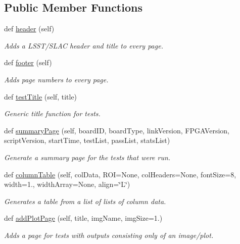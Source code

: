 \subsection*{Public Member Functions}
\begin{DoxyCompactItemize}
\item 
def \hyperlink{classpdf_gen_w_r_e_b_1_1_p_d_f_ae0da62a475a1b97d62428ae3c662f2a6}{header} (self)
\begin{DoxyCompactList}\small\item\em Adds a L\+S\+S\+T/\+S\+L\+AC header and title to every page. \end{DoxyCompactList}\item 
def \hyperlink{classpdf_gen_w_r_e_b_1_1_p_d_f_a01a4153716448dc03856712735fee900}{footer} (self)
\begin{DoxyCompactList}\small\item\em Adds page numbers to every page. \end{DoxyCompactList}\item 
def \hyperlink{classpdf_gen_w_r_e_b_1_1_p_d_f_a682682f02997f0cc3fefc7468265a90b}{test\+Title} (self, title)
\begin{DoxyCompactList}\small\item\em Generic title function for tests. \end{DoxyCompactList}\item 
def \hyperlink{classpdf_gen_w_r_e_b_1_1_p_d_f_a08028486631686cbf99a23e97485478b}{summary\+Page} (self, board\+ID, board\+Type, link\+Version, F\+P\+G\+A\+Version, script\+Version, start\+Time, test\+List, pass\+List, stats\+List)
\begin{DoxyCompactList}\small\item\em Generate a summary page for the tests that were run. \end{DoxyCompactList}\item 
def \hyperlink{classpdf_gen_w_r_e_b_1_1_p_d_f_a38eb7da8869e7b9252f9e6dad3d5129b}{column\+Table} (self, col\+Data, R\+OI=None, col\+Headers=None, font\+Size=8, width=1., width\+Array=None, align=\char`\"{}L\char`\"{})
\begin{DoxyCompactList}\small\item\em Generates a table from a list of lists of column data. \end{DoxyCompactList}\item 
def \hyperlink{classpdf_gen_w_r_e_b_1_1_p_d_f_ab9270daacb7fb78b62b040fb389a1a3f}{add\+Plot\+Page} (self, title, img\+Name, img\+Size=1.)
\begin{DoxyCompactList}\small\item\em Adds a page for tests with outputs consisting only of an image/plot. \end{DoxyCompactList}\item 

\end{DoxyCompactItemize}

